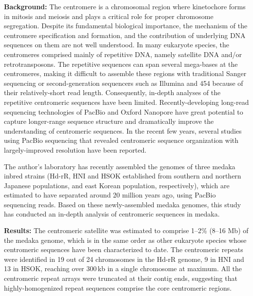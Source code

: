 \noindent\textbf{Background:} The centromere is a chromosomal region where kinetochore forms in mitosis and meiosis and plays a critical role for proper chromosome segregation. Despite its fundamental biological importance, the mechanism of the centromere specification and formation, and the contribution of underlying DNA sequences on them are not well understood. In many eukaryote species, the centromeres comprised mainly of repetitive DNA, namely satellite DNA and/or retrotransposons. The repetitive sequences can span several mega-bases at the centromeres, making it difficult to assemble these regions with traditional Sanger sequencing or second-generation sequencers such as Illumina and 454 because of their relatively-short read length. Consequently, in-depth analyses of the repetitive centromeric sequences have been limited. Recently-developing long-read sequencing technologies of PacBio and Oxford Nanopore have great potential to capture longer-range sequence structure and dramatically improve the understanding of centromeric sequences. In the recent few years, several studies using PacBio sequencing that revealed centromeric sequence organization with largely-improved resolution have been reported.

The author's laboratory has recently assembled the genomes of three medaka inbred strains (Hd-rR, HNI and HSOK established from southern and northern Japanese populations, and east Korean population, respectively), which are estimated to have separated around 20 million years ago, using PacBio sequencing reads. Based on these newly-assembled medaka genomes, this study has conducted an in-depth analysis of centromeric sequences in medaka.

\vspace{0.7cm}
\noindent\textbf{Results:} The centromeric satellite was estimated to comprise 1--2\% (8--16 Mb) of the medaka genome, which is in the same order as other eukaryote species whose centromeric sequences have been characterized to date. The centromeric repeats were identified in 19 out of 24 chromosomes in the Hd-rR genome, 9 in HNI and 13 in HSOK, reaching over 300\,kb in a single chromosome at maximum. All the centromeric repeat arrays were truncated at their contig ends, suggesting that highly-homogenized repeat sequences comprise the core centromeric regions.

